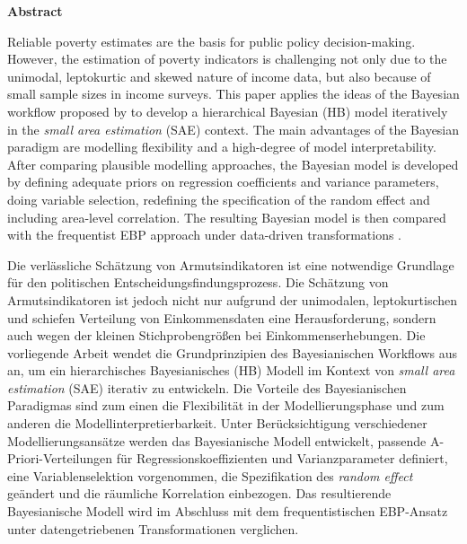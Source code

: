 \begin{center}
    \LARGE
    \textbf{Abstract}
\end{center}
\vspace{2cm}

Reliable poverty estimates are the basis for public policy decision-making.
However, the estimation of poverty indicators is challenging not only due to the unimodal, leptokurtic and skewed nature of income data, but also because of small sample sizes in income surveys.
This paper applies the ideas of the Bayesian workflow proposed by \cite{gelman_bayesian_2020} to develop a hierarchical Bayesian (HB) model iteratively in the \textit{small area estimation} (SAE) context.
The main advantages of the Bayesian paradigm are modelling flexibility and a high-degree of model interpretability.
After comparing plausible modelling approaches, the Bayesian model is developed by defining adequate priors on regression coefficients and variance parameters, doing variable selection, redefining the specification of the random effect and including area-level correlation.
The resulting Bayesian model is then compared with the frequentist EBP approach under data-driven transformations \citep{rojas_perilla_data_2020}.

\vspace{3cm}

Die verlässliche Schätzung von Armutsindikatoren ist eine notwendige Grundlage für den politischen Entscheidungsfindungsprozess.
Die Schätzung von Armutsindikatoren ist jedoch nicht nur aufgrund der unimodalen, leptokurtischen und schiefen Verteilung von Einkommensdaten eine Herausforderung, sondern auch wegen der kleinen Stichprobengrößen bei Einkommenserhebungen.
Die vorliegende Arbeit wendet die Grundprinzipien des Bayesianischen Workflows aus \cite{gelman_bayesian_2020} an, um ein hierarchisches Bayesianisches (HB) Modell im Kontext von \textit{small area estimation} (SAE) iterativ zu entwickeln.
Die Vorteile des Bayesianischen Paradigmas sind zum einen die Flexibilität in der Modellierungsphase und zum anderen die Modellinterpretierbarkeit.
Unter Berücksichtigung verschiedener Modellierungsansätze werden das Bayesianische Modell entwickelt, passende A-Priori-Verteilungen für Regressionskoeffizienten und Varianzparameter definiert, eine Variablenselektion vorgenommen, die Spezifikation des \textit{random effect} geändert und die räumliche Korrelation einbezogen.
Das resultierende Bayesianische Modell wird im Abschluss mit dem frequentistischen EBP-Ansatz unter datengetriebenen Transformationen \citep{rojas_perilla_data_2020} verglichen.
